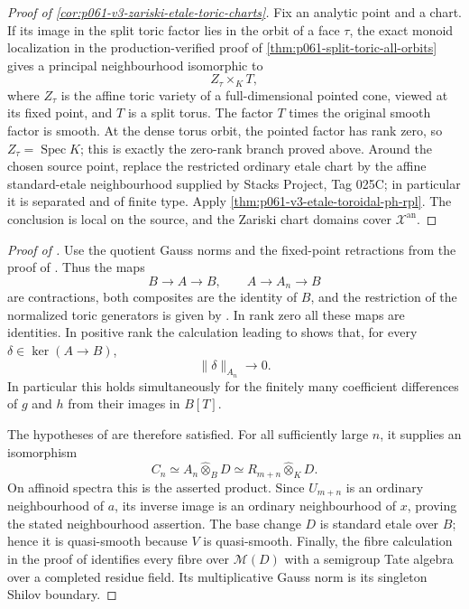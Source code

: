 \begin{proof}[Proof of
\cref{cor:p061-v3-zariski-etale-toric-charts}]
Fix an analytic point and a chart. If its image in the split toric factor
lies in the orbit of a face \(\tau\), the exact monoid localization in the
production-verified proof of
\cref{thm:p061-split-toric-all-orbits} gives a principal neighbourhood
isomorphic to
\[
                         Z_\tau\times_KT,
\]
where \(Z_\tau\) is the affine toric variety of a full-dimensional pointed
cone, viewed at its fixed point, and \(T\) is a split torus. The factor
\(T\) times the original smooth factor is smooth. At the dense torus orbit,
the pointed factor has rank zero, so \(Z_\tau=\operatorname{Spec}K\); this is
exactly the zero-rank branch proved above. Around the chosen source point,
replace the restricted ordinary etale chart by the affine
standard-etale neighbourhood supplied by Stacks Project, Tag 025C; in
particular it is separated and of finite type. Apply
\cref{thm:p061-v3-etale-toroidal-ph-rpl}. The
conclusion is local on the source, and the Zariski chart domains cover
\(\mathcal X^{\mathrm{an}}\).
\end{proof}

\begin{proof}[Proof of
]
Use the quotient Gauss norms and the fixed-point retractions from the proof
of .  Thus the maps
\[
 B\longrightarrow A\longrightarrow B,
 \qquad A\longrightarrow A_n\longrightarrow B
\]
are contractions, both composites are the identity of \(B\), and the
restriction of the normalized toric generators is given by
.  In rank zero all these maps are
identities.  In positive rank the calculation leading to
 shows that, for every
\(\delta\in\ker(A\to B)\),
\[
                         \|\delta\|_{A_n}\longrightarrow0.
\]
In particular this holds simultaneously for the finitely many coefficient
differences of \(g\) and \(h\) from their images in \(B[T]\).

The hypotheses of
 are therefore satisfied.
For all sufficiently large \(n\), it supplies an isomorphism
\[
 C_n\simeq A_n\widehat\otimes_BD
       \simeq R_{m+n}\widehat\otimes_KD.
\]
On affinoid spectra this is the asserted product.  Since \(U_{m+n}\) is an
ordinary neighbourhood of \(a\), its inverse image is an ordinary
neighbourhood of \(x\), proving the stated neighbourhood assertion.  The
base change \(D\) is standard etale over \(B\); hence it is quasi-smooth
because \(V\) is quasi-smooth.  Finally, the fibre calculation in the proof
of  identifies every fibre over
\(\mathcal M(D)\) with a semigroup Tate algebra over a completed residue
field.  Its multiplicative Gauss norm is its singleton Shilov boundary.
\end{proof}

